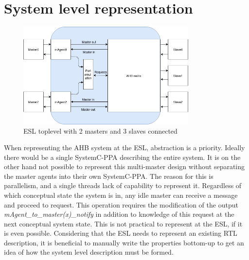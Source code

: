 \section{System level representation}
\label{sec:syslev}
\begin{figure}[hbt]
    \begin{center}
        \includegraphics[width=0.8\textwidth]{figs/ESL/Syslev.png}
    \end{center}
    \caption{ESL toplevel with 2 masters and 3 slaves connected}
    \label{fig:esl_toplev}
\end{figure}

When representing the AHB system at the ESL, abstraction is a priority. Ideally there would be a single SystemC-PPA describing the entire system. It is on 
the other hand not possible to represent this multi-master design without separating the master agents into their own SystemC-PPA. The reason for this is 
parallelism, and a single threads lack of capability to represent it. Regardless of which conceptual state the system is in, any idle master can receive 
a message and proceed to request. This operation requires the modification of the output \textit{mAgent\_to\_master(x)\_notify} in addition to knowledge of this
request at the next conceptual system state. This is not practical to represent at the ESL, if it is even possible. Considering that the ESL needs to represent an existing RTL description, it is beneficial to manually write the properties bottom-up to get an idea of how the system level description must be formed.

